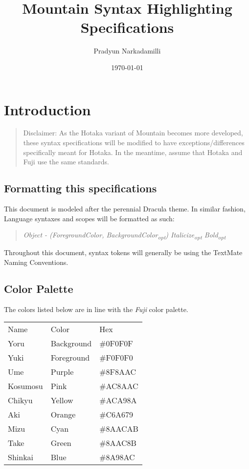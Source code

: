 \documentclass[11pt]{article}
\author{Pradyun Narkadamilli}
\date{\today}
\title{Mountain Syntax Highlighting Specifications}
\begin{document}
\maketitle
\tableofcontents



\section{Introduction}
\label{sec:org7515805}
\begin{quote}
Disclaimer: As the Hotaka variant of Mountain becomes more developed, these syntax specifications will be modified to have exceptions/differences specifically meant for Hotaka. In the meantime, assume that Hotaka and Fuji use the same standards.
\end{quote}

\subsection{Formatting this specifications}
\label{sec:org2dfd4a2}
This document is modeled after the perennial Dracula theme. In similar fashion, Language syntaxes and scopes will be formatted as such:
\begin{quote}
\emph{Object - (ForegroundColor, BackgroundColor\textsubscript{opt}) Italicize\textsubscript{opt} Bold\textsubscript{opt}}
\end{quote}
Throughout this document, syntax tokens will generally be using the TextMate Naming Conventions.

\subsection{Color Palette}
\label{sec:orgffc3423}
The colors listed below are in line with the \emph{Fuji} color palette.
\begin{center}
\begin{tabular}{lll}
Name & Color & Hex\\
Yoru & Background & \#0F0F0F\\
Yuki & Foreground & \#F0F0F0\\
Ume & Purple & \#8F8AAC\\
Kosumosu & Pink & \#AC8AAC\\
Chikyu & Yellow & \#ACA98A\\
Aki & Orange & \#C6A679\\
Mizu & Cyan & \#8AACAB\\
Take & Green & \#8AAC8B\\
Shinkai & Blue & \#8A98AC\\
\end{tabular}
\end{center}
\end{document}
